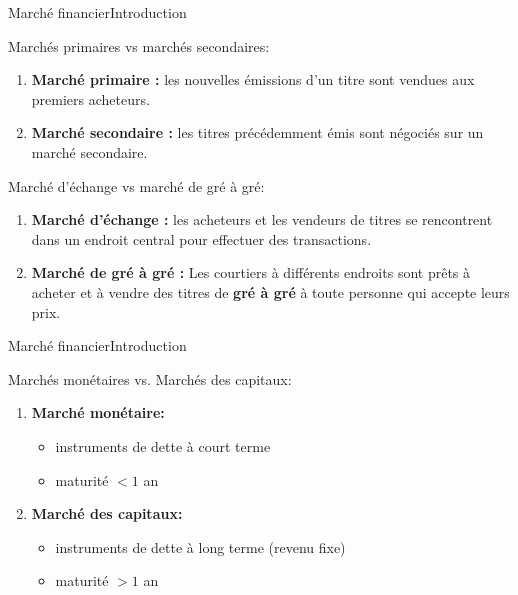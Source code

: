 \documentclass{beamer}
\begin{document}
\begin{frame}{Marché financier}{Introduction}
\begin{block}{Marchés primaires vs marchés secondaires:}
\begin{enumerate}
\item \textbf{Marché primaire :} les nouvelles émissions d'un titre sont vendues aux premiers acheteurs.
\item \textbf{Marché secondaire :} les titres précédemment émis sont négociés sur un marché secondaire.
\end{enumerate}
\end{block}
\begin{block}{Marché d'échange vs marché de gré à gré:}
\begin{enumerate}
\item \textbf{Marché d'échange :} les acheteurs et les vendeurs de titres se rencontrent dans un endroit central pour effectuer des transactions.
\item \textbf{Marché de gré à gré :} Les courtiers à différents endroits sont prêts à acheter et à vendre des titres de \textbf{gré à gré} à toute personne qui accepte leurs prix.
\end{enumerate}
\end{block}
\end{frame}

\begin{frame}{Marché financier}{Introduction}
\begin{block}{Marchés monétaires vs. Marchés des capitaux:}
\begin{enumerate}
\item \textbf{Marché monétaire:} 
\begin{itemize}
\item instruments de dette à court terme
\item maturité $< 1$ an
\end{itemize}
\item \textbf{Marché des capitaux:}
\begin{itemize}
\item instruments de dette à long terme (revenu fixe)
\item maturité $> 1$ an
\end{itemize}
\end{enumerate}
\end{block}

\end{frame}
\end{document}
